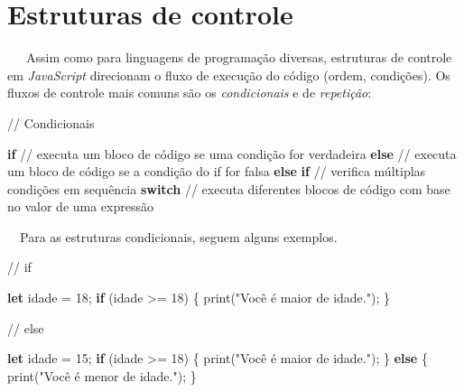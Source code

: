 \documentclass[
  portuguese,
  letterpaper,
  DIV=11,
  numbers=noendperiod]{scrreprt}
\newenvironment{Shaded}{\begin{snugshade}}{\end{snugshade}}
\newcommand{\CommentTok}[1]{\textcolor[rgb]{0.37,0.37,0.37}{#1}}
\newcommand{\ControlFlowTok}[1]{\textcolor[rgb]{0.00,0.23,0.31}{\textbf{#1}}}
\newcommand{\DecValTok}[1]{\textcolor[rgb]{0.68,0.00,0.00}{#1}}
\newcommand{\FunctionTok}[1]{\textcolor[rgb]{0.28,0.35,0.67}{#1}}
\newcommand{\KeywordTok}[1]{\textcolor[rgb]{0.00,0.23,0.31}{\textbf{#1}}}
\newcommand{\NormalTok}[1]{\textcolor[rgb]{0.00,0.23,0.31}{#1}}
\newcommand{\OperatorTok}[1]{\textcolor[rgb]{0.37,0.37,0.37}{#1}}
\newcommand{\StringTok}[1]{\textcolor[rgb]{0.13,0.47,0.30}{#1}}
\begin{document}
\hfill\break


\chapter{Estruturas de controle}\label{estruturas-de-controle}

~~~Assim como para linguagens de programação diversas, estruturas de
controle em \emph{JavaScript} direcionam o fluxo de execução do código
(ordem, condições). Os fluxos de controle mais comuns são os
\emph{condicionais} e de \emph{repetição}:

\hfill\break

\begin{Shaded}
\begin{Highlighting}[]
\CommentTok{// Condicionais}

\ControlFlowTok{if}  \CommentTok{// executa um bloco de código se uma condição for verdadeira}
\ControlFlowTok{else}  \CommentTok{// executa um bloco de código se a condição do if for falsa}
\ControlFlowTok{else} \ControlFlowTok{if}   \CommentTok{// verifica múltiplas condições em sequência}
\ControlFlowTok{switch} \CommentTok{// executa diferentes blocos de código com base no valor de uma expressão}
\end{Highlighting}
\end{Shaded}

\hfill\break

~~Para as estruturas condicionais, seguem alguns exemplos.

\begin{Shaded}
\begin{Highlighting}[]

\CommentTok{// if}

\KeywordTok{let}\NormalTok{ idade }\OperatorTok{=} \DecValTok{18}\OperatorTok{;}
\ControlFlowTok{if}\NormalTok{ (idade }\OperatorTok{\textgreater{}=} \DecValTok{18}\NormalTok{) \{}
  \FunctionTok{print}\NormalTok{(}\StringTok{"Você é maior de idade."}\NormalTok{)}\OperatorTok{;}
\NormalTok{\}}
\end{Highlighting}
\end{Shaded}

\hfill\break

\begin{Shaded}
\begin{Highlighting}[]
\CommentTok{// else}

\KeywordTok{let}\NormalTok{ idade }\OperatorTok{=} \DecValTok{15}\OperatorTok{;}
\ControlFlowTok{if}\NormalTok{ (idade }\OperatorTok{\textgreater{}=} \DecValTok{18}\NormalTok{) \{}
  \FunctionTok{print}\NormalTok{(}\StringTok{"Você é maior de idade."}\NormalTok{)}\OperatorTok{;}
\NormalTok{\} }\ControlFlowTok{else}\NormalTok{ \{}
  \FunctionTok{print}\NormalTok{(}\StringTok{"Você é menor de idade."}\NormalTok{)}\OperatorTok{;}
\NormalTok{\}}
\end{Highlighting}
\end{Shaded}
\end{document}
